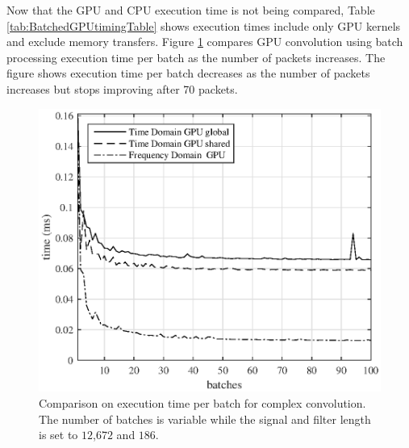 Now that the GPU and CPU execution time is not being compared, Table \ref{tab:BatchedGPUtimingTable} shows execution times include only GPU kernels and exclude memory transfers.
Figure \ref{fig:CPUvsGPU_varyBatches_186taps_12672signal_timePerBatch} compares GPU convolution using batch processing execution time per batch as the number of packets increases.
The figure shows execution time per batch decreases as the number of packets increases but stops improving after 70 packets.
\begin{figure}
	\centering\includegraphics[width=5in]{figures/gpu_intro/CPUvsGPU_varyBatches_186taps_12672signal_timePerBatch.eps}
	\caption{Comparison on execution time per batch for complex convolution. The number of batches is variable while the signal and filter length is set to $12$,$672$ and $186$.}
	\label{fig:CPUvsGPU_varyBatches_186taps_12672signal_timePerBatch}
\end{figure}


